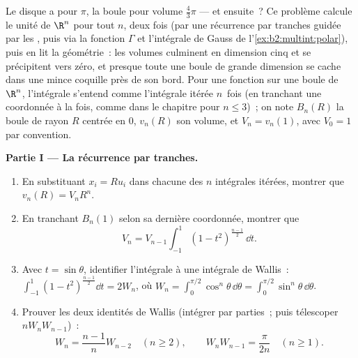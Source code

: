 \begin{problem}[{Problème du week-end --- $V_n =
\pi^{n/2}/\Gamma(\frac n2 + 1)$, et l'étrangeté des grandes
dimensions}]\label{pb:b2:multint:1}
Le disque a pour  $\pi$, la boule pour volume $\frac43\pi$ --- et
ensuite~? Ce problème calcule le  unité de
$\R^n$ pour tout $n$, deux fois (par une récurrence par tranches
guidée par les , puis via la fonction $\Gamma$ et
l'intégrale de Gauss de l'\cref{ex:b2:multint:polar}), puis en lit
la géométrie~: les volumes culminent en dimension cinq et se
précipitent vers zéro, et presque toute une boule de grande dimension
se cache dans une mince coquille près de son bord. Pour une fonction  sur une
boule de $\R^n$, l'intégrale s'entend comme l'intégrale itérée $n$~fois
(en tranchant une coordonnée à la fois, comme dans le chapitre pour $n
\leq 3$)~; on note $B_n(R)$ la boule  de rayon $R$
centrée en $0$, $v_n(R)$ son volume, et $V_n =
v_n(1)$, avec $V_0 = 1$ par convention.

\medskip
\noindent\textbf{Partie I --- La récurrence par tranches.}
\begin{enumerate}
  \item En substituant $x_i = Ru_i$ dans chacune des $n$ intégrales
        itérées, montrer que $v_n(R) = V_nR^n$.
  \item En tranchant $B_n(1)$ selon sa dernière coordonnée, montrer
        que
        \[
        V_n = V_{n-1}\int_{-1}^{1}(1 -
        t^2)^{\frac{n-1}2}\,\dd t .
        \]
  \item Avec $t = \sin\theta$, identifier l'intégrale à une
        intégrale de Wallis~: $\int_{-1}^1(1 -
        t^2)^{\frac{n-1}2}\dd t = 2W_n$, où $W_n =
        \int_0^{\pi/2}\cos^n\theta\,\dd\theta =
        \int_0^{\pi/2}\sin^n\theta\,\dd\theta$.
  \item Prouver les deux identités de Wallis (intégrer par parties~;
        puis télescoper $nW_nW_{n-1}$)~:
        \[
        W_n = \frac{n-1}nW_{n-2} \quad (n \geq 2),
        \qquad
        W_nW_{n-1} = \frac{\pi}{2n} \quad (n \geq 1).
        \]
\end{enumerate}


\end{problem}
